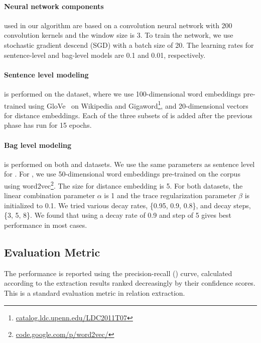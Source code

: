 \paragraph{Neural network components} used in our algorithm are based on a convolution neural network with 200 convolution kernels and the window size is 3. To train the network, we use stochastic gradient descend (SGD) with a batch size of 20.  The learning rates for sentence-level  and bag-level models are 0.1 and 0.01, respectively.

\paragraph{Sentence level modeling}
 is performed on the \TimeRE dataset, where we use 100-dimensional word embeddings pre-trained using GloVe~\cite{pennington2014glove} on Wikipedia and Gigaword\footnote{\url{catalog.ldc.upenn.edu/LDC2011T07}}, and 20-dimensional vectors for distance embeddings. Each of the three subsets of \TimeRE is added after the previous phase has run for 15 epochs. 

\paragraph{Bag level modeling}
is performed on both  \TimeRE and  \EntityRE datasets. We use the same parameters as sentence level for \TimeRE.
For \EntityRE, we use 50-dimensional word embeddings pre-trained on the \NYT corpus using word2vec\footnote{\url{code.google.com/p/word2vec/}}. The size for distance embedding is 5. For both datasets, the linear combination parameter $\alpha$ is 1 and the trace regularization parameter $\beta$ is initialized to 0.1. We tried various decay rates, \{0.95, 0.9, 0.8\}, and decay steps, \{3, 5, 8\}. We found that using a decay rate of 0.9 and step of 5 gives best performance in most cases.

\subsection{Evaluation Metric}
The performance is reported using the precision-recall (\PR) curve, calculated according to the extraction results ranked decreasingly by their confidence scores. This is a standard evaluation metric in relation extraction.

